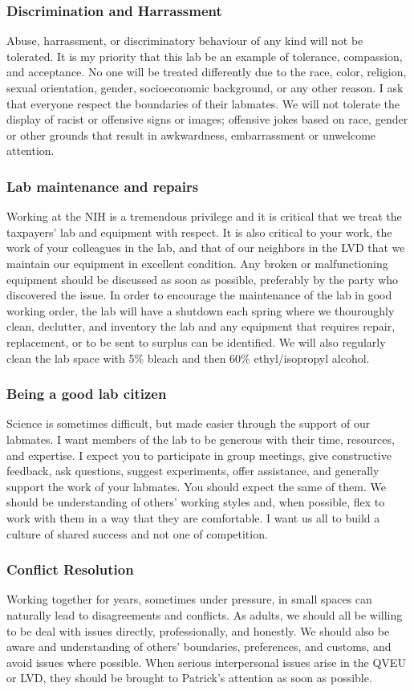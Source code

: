 \documentclass[10pt, a4paper, twocolumn]{article} %
\begin{document}
\subsubsection{Discrimination and Harrassment}
Abuse, harrassment, or discriminatory behaviour of any kind will not be tolerated. It is my priority that this lab be an example of tolerance, compassion, and acceptance. No one will be treated differently due to the race, color, religion, sexual orientation, gender, socioeconomic background, or any other reason. I ask that everyone respect the boundaries of their labmates. We will not tolerate the display of racist or offensive signs or images; offensive jokes based on race, gender or other grounds that result in awkwardness, embarrassment or unwelcome attention.
\subsubsection{Lab maintenance and repairs}
Working at the NIH is a tremendous privilege and it is critical that we treat the taxpayers' lab and equipment with respect. It is also critical to your work, the work of your colleagues in the lab, and that of our neighbors in the LVD that we maintain our equipment in excellent condition. Any broken or malfunctioning equipment should be discussed as soon as possible, preferably by the party who discovered the issue.
In order to encourage the maintenance of the lab in good working order, the lab will have a shutdown each spring where we thouroughly clean, declutter, and inventory the lab and any equipment that requires repair, replacement, or to be sent to surplus can be identified. We will also regularly clean the lab space with 5\% bleach and then 60\% ethyl/isopropyl alcohol.
\subsubsection{Being a good lab citizen}
Science is sometimes difficult, but made easier through the support of our labmates. I want members of the lab to be generous with their time, resources, and expertise. I expect you to participate in group meetings, give constructive feedback, ask questions, suggest experiments, offer assistance, and generally support the work of your labmates. You should expect the same of them. We should be understanding of others' working styles and, when possible, flex to work with them in a way that they are comfortable. I want us all to build a culture of shared success and not one of competition.
\subsubsection{Conflict Resolution}
Working together for years, sometimes under pressure, in small spaces can naturally lead to disagreements and conflicts. As adults, we should all be willing to be deal with issues directly, professionally, and honestly. We should also be aware and understanding of others' boundaries, preferences, and customs, and avoid issues where possible. When serious interpersonal issues arise in the QVEU or LVD, they should be brought to Patrick's attention as soon as possible.
\end{document}
